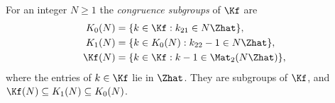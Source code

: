 For an integer $N\ge1$ the \emph{congruence subgroups} of $\Kf$ are
\begin{align*}
  K_0(N)&=\{k\in\Kf:k_{21}\in N\Zhat\},\\
  K_1(N)&=\{k\in K_0(N):k_{22}-1\in N\Zhat\},\\
  \Kf(N)&=\{k\in\Kf:k-1\in\Mat_2(N\Zhat)\},
\end{align*}
where the entries of $k\in\Kf$ lie in $\Zhat$. They are subgroups of $\Kf$, and $\Kf(N)\subseteq K_1(N)\subseteq K_0(N)$.
